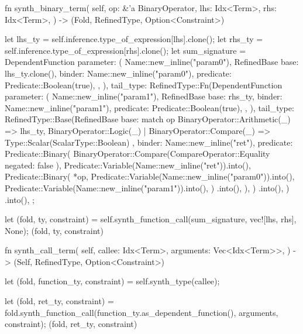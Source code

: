 \documentclass[
  oneside,
  english,
  coorientadorbanca,
  noabntexcite
]{ufsc-thesis-rn46-2019}
\begin{document}
\begin{rustcode}
{    fn synth_binary_term(
        self,
        op: &'a BinaryOperator,
        lhs: Idx<Term>,
        rhs: Idx<Term>,
    ) -> (Fold, RefinedType, Option<Constraint>) {
        let lhs_ty = self.inference.type_of_expression[lhs].clone();
        let rhs_ty = self.inference.type_of_expression[rhs].clone();
        let sum_signature = DependentFunction {
            parameter: (
                Name::new_inline("param0"),
                RefinedBase {
                    base: lhs_ty.clone(),
                    binder: Name::new_inline("param0"),
                    predicate: Predicate::Boolean(true),
                },
            ),
            tail_type: RefinedType::Fn(DependentFunction {
                parameter: (
                    Name::new_inline("param1"),
                    RefinedBase {
                        base: rhs_ty,
                        binder: Name::new_inline("param1"),
                        predicate: Predicate::Boolean(true),
                    },
                ),
                tail_type: RefinedType::Base(RefinedBase {
                    base: match op {
                        BinaryOperator::Arithmetic(_) => lhs_ty,
                        BinaryOperator::Logic(_) | BinaryOperator::Compare(_) => {
                            Type::Scalar(ScalarType::Boolean)
                        }
                    },
                    binder: Name::new_inline("ret"),
                    predicate: Predicate::Binary(
                        BinaryOperator::Compare(CompareOperator::Equality { negated: false }),
                        Predicate::Variable(Name::new_inline("ret")).into(),
                        Predicate::Binary(
                            *op,
                            Predicate::Variable(Name::new_inline("param0")).into(),
                            Predicate::Variable(Name::new_inline("param1")).into(),
                        )
                        .into(),
                    ),
                })
                .into(),
            })
            .into(),
        };

        let (fold, ty, constraint) = self.synth_function_call(sum_signature, vec![lhs, rhs], None);
        (fold, ty, constraint)
    }

    fn synth_call_term(
        self,
        callee: Idx<Term>,
        arguments: Vec<Idx<Term>>,
    ) -> (Self, RefinedType, Option<Constraint>) {
        let (fold, function_ty, constraint) = self.synth_type(callee);

        let (fold, ret_ty, constraint) =
            fold.synth_function_call(function_ty.as_dependent_function(), arguments, constraint);
        (fold, ret_ty, constraint)
    }

}
\end{rustcode}
\end{document}
